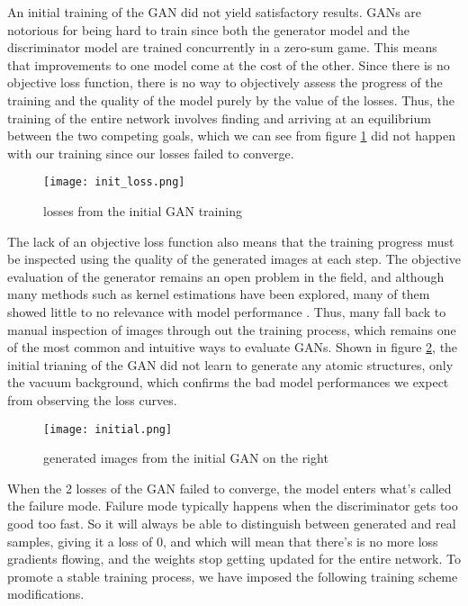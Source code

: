 \documentclass{article}
\begin{document}
An initial training of the GAN did not yield satisfactory results. GANs are notorious for being hard to train since both the generator model and the discriminator model are trained concurrently in a zero-sum game. This means that improvements to one model come at the cost of the other. Since there is no objective loss function, there is no way to objectively assess the progress of the training and the quality of the model purely by the value of the losses. Thus, the training of the entire network involves finding and arriving at an equilibrium between the two competing goals, which we can see from figure \ref{fig:init_loss} did not happen with our training since our losses failed to converge. 
\begin{figure}[!h]
    \centering
    \texttt{[image: init\_loss.png]}
    \caption{losses from the initial GAN training}
    \label{fig:init_loss}
\end{figure}
\FloatBarrier

The lack of an objective loss function also means that the training progress must be inspected using the quality of the generated images at each step. The objective evaluation of the generator remains an open problem in the field, and although many methods such as kernel estimations \cite{DCGAN} have been explored, many of them showed little to no relevance with model performance \cite{GANeval}. Thus, many fall back to manual inspection of images through out the training process, which remains one of the most common and intuitive ways to evaluate GANs. Shown in figure \ref{fig:initial}, the initial trianing of the GAN did not learn to generate any atomic structures, only the vacuum background, which confirms the bad model performances we expect from observing the loss curves. 
\begin{figure}[!h]
    \centering
    \texttt{[image: initial.png]}
    \caption{generated images from the initial GAN on the right}
    \label{fig:initial}
\end{figure}
\FloatBarrier

When the 2 losses of the GAN failed to converge, the model enters what's called the failure mode. Failure mode typically happens when the discriminator gets too good too fast. So it will always be able to distinguish between generated and real samples, giving it a loss of 0, and which will mean that there's is no more loss gradients flowing, and the weights stop getting updated for the entire network. To promote a stable training process, we have imposed the following training scheme modifications. 
\end{document}
